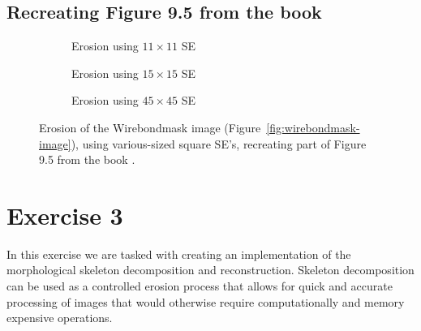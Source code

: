 \documentclass{article}
\begin{document}
\subsection*{Recreating Figure 9.5 from the book}
\begin{figure}[H]
     \centering
     \begin{subfigure}[b]{0.3\textwidth}
         \centering
         
         \caption{Erosion using $11 \times 11$ SE}
         \label{fig:book9.5figure-wirebondmask-image-11x11}
     \end{subfigure}
     \hfill
     \begin{subfigure}[b]{0.3\textwidth}
         \centering
         
         \caption{Erosion using $15 \times 15$ SE}
         \label{fig:book9.5figure-wirebondmask-image-15x15}
     \end{subfigure}
     \hfill
     \begin{subfigure}[b]{0.3\textwidth}
         \centering
         
         \caption{Erosion using $45 \times 45$ SE}
         \label{fig:book9.5figure-wirebondmask-image-45x45}
     \end{subfigure}
     
    \caption{Erosion of the Wirebondmask image (Figure~\ref{fig:wirebondmask-image}), using various-sized square SE's, recreating part of Figure 9.5 from the book \citep{gonzalez2008digital}.}
    \label{fig:book9.5figure}
\end{figure}


\section*{Exercise 3}
In this exercise we are tasked with creating an implementation of the morphological skeleton decomposition and reconstruction. Skeleton decomposition can be used as a controlled erosion process that allows for quick and accurate processing of images that would otherwise require computationally and memory expensive operations.
\end{document}
